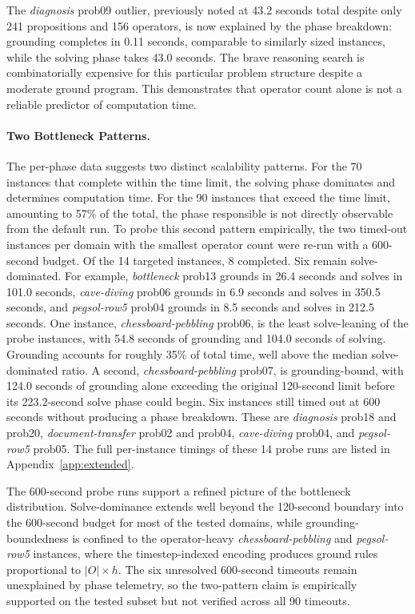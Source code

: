 The \textit{diagnosis} prob09 outlier, previously noted at 43.2 seconds total despite only 241 propositions and 156 operators, is now explained by the phase breakdown: grounding completes in 0.11 seconds, comparable to similarly sized instances, while the solving phase takes 43.0 seconds. The brave reasoning search is combinatorially expensive for this particular problem structure despite a moderate ground program. This demonstrates that operator count alone is not a reliable predictor of computation time.

\paragraph{Two Bottleneck Patterns.}
The per-phase data suggests two distinct scalability patterns. For the 70 instances that complete within the time limit, the solving phase dominates and determines computation time. For the 90 instances that exceed the time limit, amounting to 57\% of the total, the phase responsible is not directly observable from the default run. To probe this second pattern empirically, the two timed-out instances per domain with the smallest operator count were re-run with a 600-second budget. Of the 14 targeted instances, 8 completed. Six remain solve-dominated. For example, \textit{bottleneck} prob13 grounds in 26.4 seconds and solves in 101.0 seconds, \textit{cave-diving} prob06 grounds in 6.9 seconds and solves in 350.5 seconds, and \textit{pegsol-row5} prob04 grounds in 8.5 seconds and solves in 212.5 seconds. One instance, \textit{chessboard-pebbling} prob06, is the least solve-leaning of the probe instances, with 54.8 seconds of grounding and 104.0 seconds of solving. Grounding accounts for roughly 35\% of total time, well above the median solve-dominated ratio. A second, \textit{chessboard-pebbling} prob07, is grounding-bound, with 124.0 seconds of grounding alone exceeding the original 120-second limit before its 223.2-second solve phase could begin. Six instances still timed out at 600 seconds without producing a phase breakdown. These are \textit{diagnosis} prob18 and prob20, \textit{document-transfer} prob02 and prob04, \textit{cave-diving} prob04, and \textit{pegsol-row5} prob05. The full per-instance timings of these 14 probe runs are listed in Appendix~\ref{app:extended}.

The 600-second probe runs support a refined picture of the bottleneck distribution. Solve-dominance extends well beyond the 120-second boundary into the 600-second budget for most of the tested domains, while grounding-boundedness is confined to the operator-heavy \textit{chessboard-pebbling} and \textit{pegsol-row5} instances, where the timestep-indexed encoding produces ground rules proportional to $|O| \times h$. The six unresolved 600-second timeouts remain unexplained by phase telemetry, so the two-pattern claim is empirically supported on the tested subset but not verified across all 90 timeouts.

